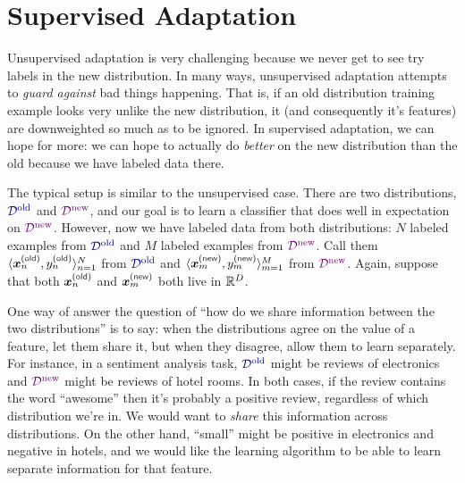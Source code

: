 \section{Supervised Adaptation}

Unsupervised adaptation is very challenging because we never get to see try labels in the new distribution.
In many ways, unsupervised adaptation attempts to \emph{guard against} bad things happening.
That is, if an old distribution training example looks very unlike the new distribution, it (and consequently it's features) are downweighted so much as to be ignored.
In supervised adaptation, we can hope for more: we can hope to actually do \emph{better} on the new distribution than the old because we have labeled data there.

\newcommand{\vxold}{\vx^{\textcolor{darkgrey}{\textsf{(old)}}}}
\newcommand{\vxnew}{\vx^{\textcolor{darkgrey}{\textsf{(new)}}}}
\newcommand{\yold}{y^{\textcolor{darkgrey}{\textsf{(old)}}}}
\newcommand{\ynew}{y^{\textcolor{darkgrey}{\textsf{(new)}}}}

The typical setup is similar to the unsupervised case. There are two distributions, $\Dold$ and $\Dnew$, and our goal is to learn a classifier that does well in expectation on $\Dnew$. However, now we have labeled data from both distributions: $N$ labeled examples from $\Dold$ and $M$ labeled examples from $\Dnew$. Call them $\langle \vxold_n, \yold_n \rangle_{n=1}^N$ from $\Dold$ and $\langle \vxnew_m, \ynew_m \rangle_{m=1}^M$ from $\Dnew$. Again, suppose that both $\vxold_n$ and $\vxnew_m$ both live in $\mathbb{R}^D$.

One way of answer the question of ``how do we share information between the two distributions'' is to say: when the distributions agree on the value of a feature, let them share it, but when they disagree, allow them to learn separately. For instance, in a sentiment analysis task, $\Dold$ might be reviews of electronics and $\Dnew$ might be reviews of hotel rooms. In both cases, if the review contains the word ``awesome'' then it's probably a positive review, regardless of which distribution we're in. We would want to \emph{share} this information across distributions. On the other hand, ``small'' might be positive in electronics and negative in hotels, and we would like the learning algorithm to be able to learn separate information for that feature.

